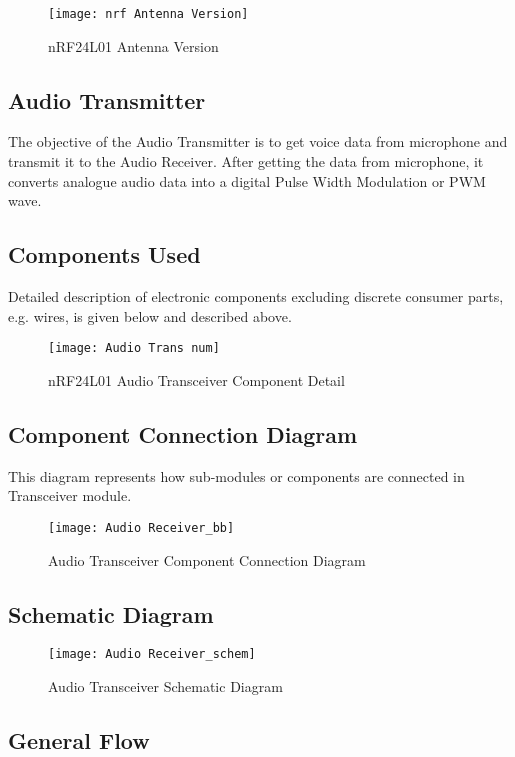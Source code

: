 \begin{figure}[h]
  \centering
  \texttt{[image: nrf Antenna Version]}
  \caption{nRF24L01 Antenna Version}
\end{figure}

\subsection{Audio Transmitter}
The objective of the Audio Transmitter is to get voice data from microphone and transmit it to the Audio Receiver. After getting the data from microphone, it converts analogue audio data into a digital Pulse Width Modulation or PWM wave.

\subsection{Components Used}
Detailed description of electronic components excluding discrete consumer parts, e.g. wires, is given below and described above.

\begin{figure}[h]
  \centering
  \texttt{[image: Audio Trans num]}
  \caption{nRF24L01 Audio Transceiver Component Detail}
\end{figure}

\subsection{Component Connection Diagram}
This diagram represents how sub-modules or components are connected in Transceiver module.


\begin{figure}[h]
  \centering
  \texttt{[image: Audio Receiver\_bb]}
  \caption{Audio Transceiver Component Connection Diagram}
\end{figure}

\newpage

\subsection{Schematic Diagram}

\begin{figure}[h]
  \centering
  \texttt{[image: Audio Receiver\_schem]}
  \caption{Audio Transceiver Schematic Diagram}
\end{figure}


\subsection{General Flow}


